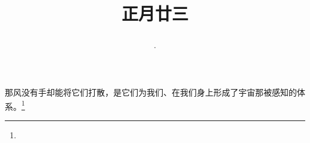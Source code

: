 \title{\date[d=3,m=3,y=2024][year:cn-y,年,month:cn,day:cn,日,·,weekday]·正月廿三 }
那风没有手却能将它们打散，是它们为我们、在我们身上形成了宇宙那被感知的体系。\footnote{ }

